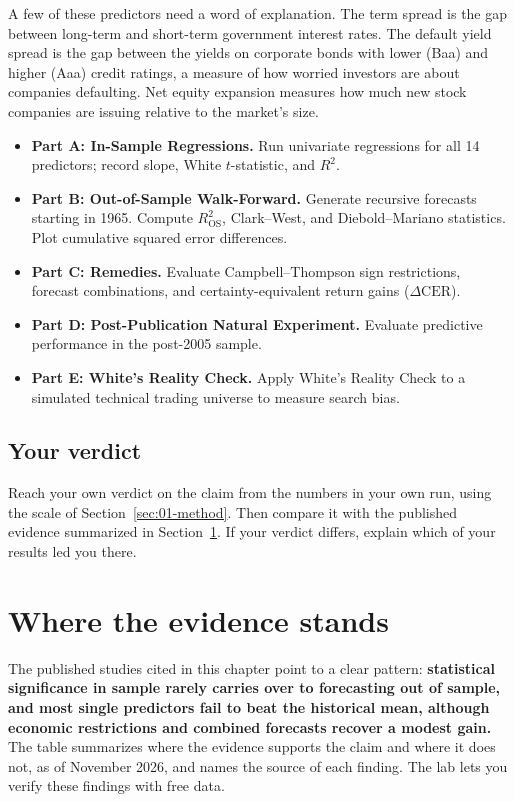 A few of these predictors need a word of explanation. The term spread is the gap between long-term and short-term government interest rates. The default yield spread is the gap between the yields on corporate bonds with lower (Baa) and higher (Aaa) credit ratings, a measure of how worried investors are about companies defaulting. Net equity expansion measures how much new stock companies are issuing relative to the market's size.

\begin{itemize}
  \item \textbf{Part A: In-Sample Regressions.} Run univariate regressions for all 14 predictors; record slope, White $t$-statistic, and $R^2$.
  \item \textbf{Part B: Out-of-Sample Walk-Forward.} Generate recursive forecasts starting in 1965. Compute $R^2_{\text{OS}}$, Clark--West, and Diebold--Mariano statistics. Plot cumulative squared error differences.
  \item \textbf{Part C: Remedies.} Evaluate Campbell--Thompson sign restrictions, forecast combinations, and certainty-equivalent return gains ($\Delta \text{CER}$).
  \item \textbf{Part D: Post-Publication Natural Experiment.} Evaluate predictive performance in the post-2005 sample.
  \item \textbf{Part E: White's Reality Check.} Apply White's Reality Check to a simulated technical trading universe to measure search bias.
\end{itemize}

\subsection*{Your verdict}

Reach your own verdict on the claim from the numbers in your own run, using the scale of Section~\ref{sec:01-method}. Then compare it with the published evidence summarized in Section~\ref{sec:09-verdict}. If your verdict differs, explain which of your results led you there.

\section{Where the evidence stands}
\label{sec:09-verdict}

The published studies cited in this chapter point to a clear pattern: \textbf{statistical significance in sample rarely carries over to forecasting out of sample, and most single predictors fail to beat the historical mean, although economic restrictions and combined forecasts recover a modest gain.} The table summarizes where the evidence supports the claim and where it does not, as of November 2026, and names the source of each finding. The lab lets you verify these findings with free data.

